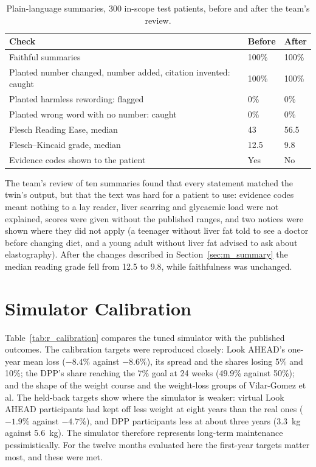 \begin{table}[htbp]
\centering
\caption{Plain-language summaries, 300 in-scope test patients, before and after the team's review.}
\label{tab:r_summaries}
\begin{tabular}{p{7.4cm}p{3cm}p{3cm}}
\toprule
Check & Before & After \\
\midrule
Faithful summaries & 100\% & 100\% \\
Planted number changed, number added, citation invented: caught & 100\% & 100\% \\
Planted harmless rewording: flagged & 0\% & 0\% \\
Planted wrong word with no number: caught & 0\% & 0\% \\
Flesch Reading Ease, median & 43 & 56.5 \\
Flesch--Kincaid grade, median & 12.5 & 9.8 \\
Evidence codes shown to the patient & Yes & No \\
\bottomrule
\end{tabular}
\end{table}

The team's review of ten summaries found that every statement matched the
twin's output, but that the text was hard for a patient to use: evidence codes
meant nothing to a lay reader, liver scarring and glycaemic load were not
explained, scores were given without the published ranges, and two notices
were shown where they did not apply (a teenager without liver fat told to see
a doctor before changing diet, and a young adult without liver fat advised to
ask about elastography). After the changes described in
Section~\ref{sec:m_summary} the median reading grade fell from 12.5 to 9.8,
while faithfulness was unchanged.

\section{Simulator Calibration}
\label{sec:r_calibration}

Table~\ref{tab:r_calibration} compares the tuned simulator with the published
outcomes. The calibration targets were reproduced closely: Look AHEAD's
one-year mean loss ($-8.4\%$ against $-8.6\%$), its spread and the shares
losing 5\% and 10\%; the DPP's share reaching the 7\% goal at 24 weeks (49.9\%
against 50\%); and the shape of the weight course and the weight-loss groups
of Vilar-Gomez et al. The held-back targets show where the simulator is
weaker: virtual Look AHEAD participants had kept off less weight at eight
years than the real ones ($-1.9\%$ against $-4.7\%$), and DPP participants less
at about three years (3.3~kg against 5.6~kg). The simulator therefore
represents long-term maintenance pessimistically. For the twelve months
evaluated here the first-year targets matter most, and these were met.

